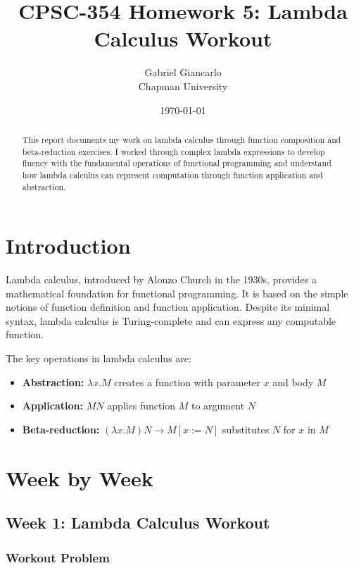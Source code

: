 \documentclass{article}
\title{CPSC-354 Homework 5: Lambda Calculus Workout}
\author{Gabriel Giancarlo \\ Chapman University}
\date{\today}
\theoremstyle{plain}
\theoremstyle{definition}
\theoremstyle{remark}
\begin{document}
\maketitle

\begin{abstract}
This report documents my work on lambda calculus through function composition and beta-reduction exercises. I worked through complex lambda expressions to develop fluency with the fundamental operations of functional programming and understand how lambda calculus can represent computation through function application and abstraction.
\end{abstract}

\setcounter{tocdepth}{3}
\tableofcontents

\section{Introduction}\label{intro}

Lambda calculus, introduced by Alonzo Church in the 1930s, provides a mathematical foundation for functional programming. It is based on the simple notions of function definition and function application. Despite its minimal syntax, lambda calculus is Turing-complete and can express any computable function.

The key operations in lambda calculus are:
\begin{itemize}
\item \textbf{Abstraction:} $\lambda x.M$ creates a function with parameter $x$ and body $M$
\item \textbf{Application:} $M N$ applies function $M$ to argument $N$
\item \textbf{Beta-reduction:} $(\lambda x.M) N \to M[x := N]$ substitutes $N$ for $x$ in $M$
\end{itemize}

\section{Week by Week}\label{homework}

\subsection{Week 1: Lambda Calculus Workout}

\subsubsection{Workout Problem}
\end{document}
